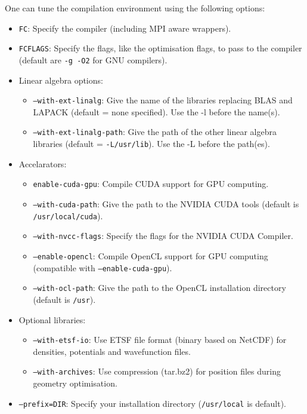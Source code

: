 \documentclass[a4paper,11pt]{report}
\begin{document}
One can tune the compilation environment using the following options:
\begin{itemize}
  \item \texttt{FC}: Specify the compiler (including MPI aware wrappers).
  \item \texttt{FCFLAGS}: Specify the flags, like the
optimisation flags, to pass to the compiler (default are \texttt{-g
-O2} for GNU compilers).
  \item Linear algebra options:
  \begin{itemize}
    \item \texttt{--with-ext-linalg}: Give the name of the libraries replacing BLAS and LAPACK (default = none specified). Use the -l before the name(s).
    \item \texttt{--with-ext-linalg-path}: Give the path of the other linear algebra libraries (default = \texttt{-L/usr/lib}). Use the -L before the path(es).
  \end{itemize}
  \item Accelarators:
  \begin{itemize}
    \item \texttt{enable-cuda-gpu}: Compile CUDA support for GPU computing.
    \item \texttt{--with-cuda-path}: Give the path to the NVIDIA CUDA tools (default is \texttt{/usr/local/cuda}).
    \item \texttt{--with-nvcc-flags}: Specify the flags for the NVIDIA CUDA Compiler.
    \item \texttt{--enable-opencl}: Compile OpenCL support for GPU computing (compatible with \texttt{--enable-cuda-gpu}).
    \item \texttt{--with-ocl-path}: Give the path to the OpenCL installation directory (default is \texttt{/usr}).
  \end{itemize}
  \item Optional libraries:
  \begin{itemize}
    \item \texttt{--with-etsf-io}: Use ETSF file format (binary based on NetCDF) for densities, potentials and wavefunction files.
    \item \texttt{--with-archives}: Use compression (tar.bz2) for position files during geometry optimisation.
  \end{itemize}
  \item \texttt{--prefix=DIR}: Specify your installation directory (\texttt{/usr/local} is default).
\end{itemize}
\end{document}
